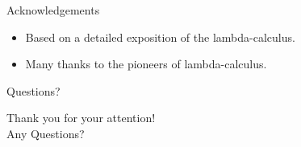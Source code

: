 \documentclass{beamer}
\begin{document}
\begin{frame}{Acknowledgements}
  \begin{itemize}
    \item Based on a detailed exposition of the lambda-calculus.
    \item Many thanks to the pioneers of lambda-calculus.
  \end{itemize}
\end{frame}

\begin{frame}{Questions?}
  \begin{center}
    \Large Thank you for your attention!\\[1em]
    Any Questions?
  \end{center}
\end{frame}

\end{document}
